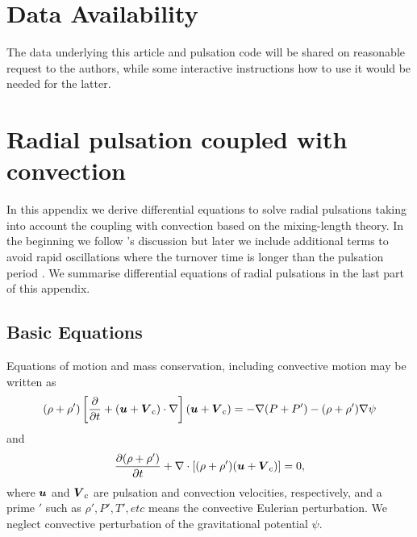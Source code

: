 \documentclass[fleqn,usenatbib]{mnras}
\def\bm#1{\mbox{\boldmath$#1$}}
\begin{document}
\section*{Data Availability}
The data underlying this article and pulsation code will be shared on reasonable 
request to the authors, while some interactive instructions 
how to use it would be needed for the latter.  
 









\appendix

\section{Radial pulsation coupled with convection}
In this appendix we derive differential equations 
to solve radial pulsations taking into account 
the coupling with convection based on the mixing-length theory.
In the beginning we follow \citet{Unno1967}'s discussion but later we include
additional terms to avoid rapid oscillations where the turnover time is
longer than the pulsation period \citep[e.g.][]{Liege2005}. 
We summarise differential equations of radial pulsations in the last part 
of this appendix.
 
\subsection{Basic Equations} 
Equations of motion and mass conservation, including convective motion may be written as
\begin{equation}
(\rho+\rho')\left[{\partial\over\partial t}+(\bm{u}+\bm{V}_{\rm c})\cdot\nabla\right]
(\bm{u}+\bm{V}_{\rm c}) = -\nabla (P+P') - (\rho+\rho')\nabla\psi
\label{eq:mom0}
\end{equation}
and
\begin{equation}
{\partial(\rho+\rho')\over\partial t} + \nabla\cdot[(\rho+\rho')(\bm{u}+\bm{V}{\rm_c})]=0,
\label{eq:mass0}
\end{equation}
where $\bm{u}$ and $\bm{V}_{\rm c}$ are pulsation and convection velocities, respectively,
and a prime $'$ such as $\rho',P', T',etc$ means the convective Eulerian perturbation. 
We neglect convective perturbation of the gravitational potential $\psi$.
\end{document}

